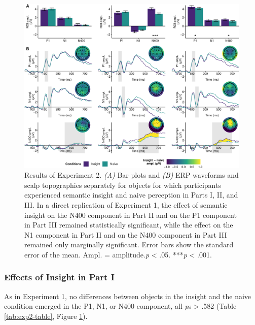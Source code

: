 \documentclass[
  english,
  man,11pt,floatsintext]{apa7}
\begin{document}
\begin{figure}

{\centering \includegraphics{manuscript_files/figure-latex/exp2-plot-1} 

}

\caption{Results of Experiment 2. \emph{(A)} Bar plots and \emph{(B)} ERP waveforms and scalp topographies separately for objects for which participants experienced semantic insight and naive perception in Parts I, II, and III. In a direct replication of Experiment 1, the effect of semantic insight on the N400 component in Part II and on the P1 component in Part III remained statistically significant, while the effect on the N1 component in Part II and on the N400 component in Part III remained only marginally significant. Error bars show the standard error of the mean. Ampl. = amplitude.\newline*\emph{p} \textless{} .05. ***\emph{p} \textless{} .001.}\label{fig:exp2-plot}
\end{figure}

\hypertarget{effects-of-insight-in-part-i-1}{%
\subsubsection{Effects of Insight in Part I}\label{effects-of-insight-in-part-i-1}}

As in Experiment 1, no differences between objects in the insight and the naive condition emerged in the P1, N1, or N400 component, all \emph{p}s \textgreater{} .582 (Table \ref{tab:exp2-table}, Figure \ref{fig:exp2-plot}).
\end{document}
